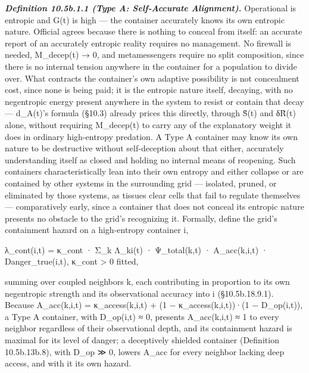 \documentclass[
]{article}
\begin{document}
\emph{\textbf{Definition 10.5b.1.1 (Type A: Self-Accurate Alignment).}}
Operational is entropic and G(t) is high --- the container accurately
knows its own entropic nature. Official agrees because there is nothing
to conceal from itself: an accurate report of an accurately entropic
reality requires no management. No firewall is needed, M\_decep(t) → 0,
and metamessengers require no split composition, since there is no
internal tension anywhere in the container for a population to divide
over. What contracts the container's own adaptive possibility is not
concealment cost, since none is being paid; it is the entropic nature
itself, decaying, with no negentropic energy present anywhere in the
system to resist or contain that decay --- d\_A(t)'s formula (§10.3)
already prices this directly, through S̃(t) and δR̃(t) alone, without
requiring M\_decep(t) to carry any of the explanatory weight it does in
ordinary high-entropy predation. A Type A container may know its own
nature to be destructive without self-deception about that either,
accurately understanding itself as closed and holding no internal means
of reopening. Such containers characteristically lean into their own
entropy and either collapse or are contained by other systems in the
surrounding grid --- isolated, pruned, or eliminated by those systems,
as tissues clear cells that fail to regulate themselves --- comparatively
early, since a container that does not conceal its entropic nature
presents no obstacle to the grid's recognizing it. Formally, define the
grid's containment hazard on a high-entropy container i,

λ\_cont(i,t) = κ\_cont · Σ\_k Λ\_ki(t) · Ψ\_total(k,t) · A\_acc(k,i,t) ·
Danger\_true(i,t), κ\_cont \textgreater{} 0 fitted,

summing over coupled neighbors k, each contributing in proportion to its
own negentropic strength and its observational accuracy into i
(§10.5b.18.9.1). Because A\_acc(k,i,t) = κ\_access(k,i,t) + (1 −
κ\_access(k,i,t))·(1 − D\_op(i,t)), a Type A container, with D\_op(i,t)
≈ 0, presents A\_acc(k,i,t) ≈ 1 to every neighbor regardless of their
observational depth, and its containment hazard is maximal for its
level of danger; a deceptively shielded container (Definition
10.5b.13b.8), with D\_op ≫ 0, lowers A\_acc for every neighbor lacking
deep access, and with it its own hazard.
\end{document}
